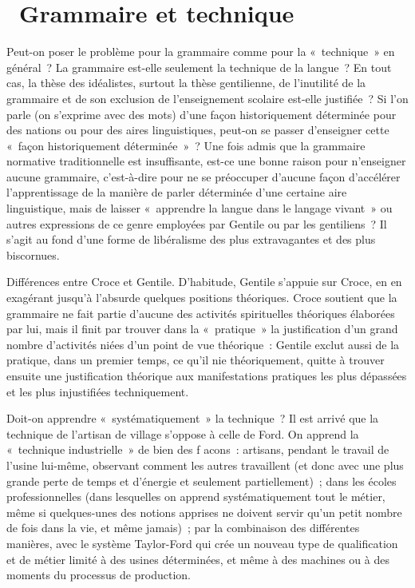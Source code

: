 \documentclass[french,twoside]{book} %
\begin{document}
\section[{ Grammaire et technique}]{ Grammaire et technique}
\noindent Peut-on poser le problème pour la grammaire comme pour la « technique » en général ? La grammaire est-elle seulement la technique de la langue ? En tout cas, la thèse des idéalistes, surtout la thèse gentilienne, de l’inutilité de la grammaire et de son exclusion de l’enseignement scolaire est-elle justifiée ? Si l’on parle (on s’exprime avec des mots) d’une façon historiquement déterminée pour des nations ou pour des aires linguistiques, peut-on se passer d’enseigner cette « façon historiquement déterminée » ? Une fois admis que la grammaire normative traditionnelle est insuffisante, est-ce une bonne raison pour n’enseigner aucune grammaire, c’est-à-dire pour ne se préoccuper d’aucune façon d’accélérer l’apprentissage de la manière de parler déterminée d’une certaine aire linguistique, mais de laisser « apprendre la langue dans le langage vivant » ou autres expressions de ce genre employées par Gentile ou par les gentiliens ? Il s’agit au fond d’une forme de libéralisme des plus extravagantes et des plus biscornues.\par
Différences entre Croce et Gentile. D'habitude, Gentile s’appuie sur Croce, en en exagérant jusqu’à l’absurde quelques positions théoriques. Croce soutient que la grammaire ne fait partie d’aucune des activités spirituelles théoriques élaborées par lui, mais il finit par trouver dans la « pratique » la justification d’un grand nombre d’activités niées d’un point de vue théorique : Gentile exclut aussi de la pratique, dans un premier temps, ce qu’il nie théoriquement, quitte à trouver ensuite une justification théorique aux manifestations pratiques les plus dépassées et les plus injustifiées techniquement.\par
Doit-on apprendre « systématiquement » la technique ? Il est arrivé que la technique de l’artisan de village s’oppose à celle de Ford. On apprend la « technique industrielle » de bien des f acons : artisans, pendant le travail de l’usine lui-même, observant comment les autres travaillent (et donc avec une plus grande perte de temps et d’énergie et seulement partiellement) ; dans les écoles professionnelles (dans lesquelles on apprend systématiquement tout le métier, même si quelques-unes des notions apprises ne doivent servir qu’un petit nombre de fois dans la vie, et même jamais) ; par la combinaison des différentes manières, avec le système Taylor-Ford qui crée un nouveau type de qualification et de métier limité à des usines déterminées, et même à des machines ou à des moments du processus de production.\par
\end{document}
